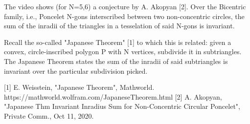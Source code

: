 The video shows (for N=5,6) a conjecture by A. Akopyan [2]. Over the Bicentric family, i.e., Poncelet N-gons interscribed between two non-concentric circles, the sum of the inradii of the triangles in a tesselation of said N-gons is invariant.  

Recall the so-called "Japanese Theorem" [1] to which this is related: given a convex, circle-inscribed polygon P with N vertices, subdivide it in subtriangles. The Japanese Theorem states the sum of the inradii of said subtriangles is invariant over the particular subdivision picked.

[1] E. Weisstein, "Japanese Theorem", Mathworld. https://mathworld.wolfram.com/JapaneseTheorem.html
[2] A. Akopyan, "Japanese Thm Invariant Inradius Sum for Non-Concentric Circular Poncelet", Private Comm., Oct 11, 2020.